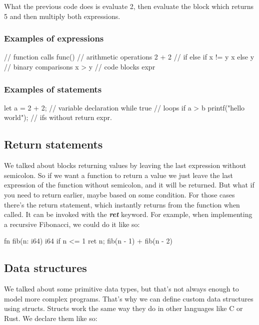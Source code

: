 ﻿\documentclass[10pt,a4paper,twocolumn,twoside]{article}
\begin{document}
What the previous code does is evaluate 2, then evaluate the block which returns
5 and then multiply both expressions.

\subsubsection{Examples of expressions}
\begin{code}
// function calls
func()
// arithmetic operations
2 + 2 
// if else
if x != y { x } else { y }
// binary comparisons
x > y 
// code blocks
{ expr }
\end{code}

\subsubsection{Examples of statements}
\begin{code}
let a = 2 + 2;  // variable declaration
while true {  } // loops
if a > b { printf("hello world"); } // ifs without return expr.
\end{code}

\subsection{Return statements}
We talked about blocks returning values by leaving the last expression without
semicolon. So if we want a function to return a value we just leave the last
expression of the function without semicolon, and it will be returned. But what
if you need to return earlier, maybe based on some condition. For those cases
there's the return statement, which instantly returns from the function when
called. It can be invoked with the \textbf{\textit{ret}} keyword. For example,
when implementing a recursive Fibonacci, we could do it like so:

\begin{code}
fn fib(n: i64) i64 {
    if n <= 1 {
        ret n;
    }
    fib(n - 1) + fib(n - 2)
}
\end{code}

\subsection{Data structures}
We talked about some primitive data types, but that's not always enough to model
more complex programs. That's why we can define custom data structures using 
structs. Structs work the same way they do in other languages like C or Rust.
We declare them like so:
\end{document}
